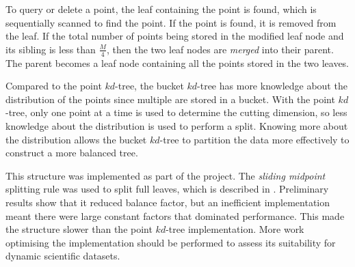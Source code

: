 To query or delete a point, the leaf containing the point is found, which is sequentially scanned to find the point. If the point is found, it is removed from the leaf. If the total number of points being stored in the modified leaf node and its sibling is less than $\frac{M}{4}$, then the two leaf nodes are \textit{merged} into their parent. The parent becomes a leaf node containing all the points stored in the two leaves.

Compared to the point $kd$-tree, the bucket $kd$-tree has more knowledge about the distribution of the points since multiple are stored in a bucket. With the point $kd$-tree, only one point at a time is used to determine the cutting dimension, so less knowledge about the distribution is used to perform a split. Knowing more about the distribution allows the bucket $kd$-tree to partition the data more effectively to construct a more balanced tree.

This structure was implemented as part of the project. The \textit{sliding midpoint} splitting rule was used to split full leaves, which is described in \cite{sliding-midpoint-split}. Preliminary results show that it reduced balance factor, but an inefficient implementation meant there were large constant factors that dominated performance. This made the structure slower than the point $kd$-tree implementation. More work optimising the implementation should be performed to assess its suitability for dynamic scientific datasets.